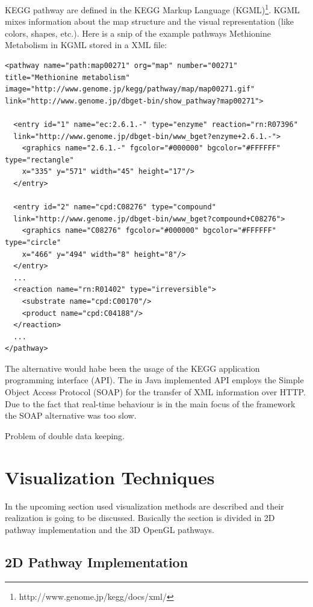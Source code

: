 KEGG pathway are defined in the KEGG Markup Language (KGML)\footnote{http://www.genome.jp/kegg/docs/xml/}.
KGML mixes information about the map structure and the visual representation (like colors, shapes, etc.).
Here is a snip of the example pathways Methionine Metabolism in KGML stored in a XML file:

\begin{verbatim}
<pathway name="path:map00271" org="map" number="00271" 
title="Methionine metabolism" 
image="http://www.genome.jp/kegg/pathway/map/map00271.gif" 
link="http://www.genome.jp/dbget-bin/show_pathway?map00271">

  <entry id="1" name="ec:2.6.1.-" type="enzyme" reaction="rn:R07396"
  link="http://www.genome.jp/dbget-bin/www_bget?enzyme+2.6.1.-">
    <graphics name="2.6.1.-" fgcolor="#000000" bgcolor="#FFFFFF" type="rectangle" 
    x="335" y="571" width="45" height="17"/>
  </entry>

  <entry id="2" name="cpd:C08276" type="compound" 
  link="http://www.genome.jp/dbget-bin/www_bget?compound+C08276">
    <graphics name="C08276" fgcolor="#000000" bgcolor="#FFFFFF" type="circle" 
    x="466" y="494" width="8" height="8"/>
  </entry>
  ...
  <reaction name="rn:R01402" type="irreversible">
    <substrate name="cpd:C00170"/>
    <product name="cpd:C04188"/>
  </reaction>
  ...
</pathway>
\end{verbatim}

The alternative would habe been the usage of the KEGG application programming interface (API). The in Java implemented API employs the Simple Object Access Protocol (SOAP) for the transfer of XML information over HTTP. Due to the fact that real-time behaviour is in the main focus of the framework the SOAP alternative was too slow.

Problem of double data keeping. 

\section{Visualization Techniques}

In the upcoming section used visualization methods are described and their realization is going to be discussed. Basically the section is divided in 2D pathway implementation and the 3D OpenGL pathways.

\subsection{2D Pathway Implementation}

